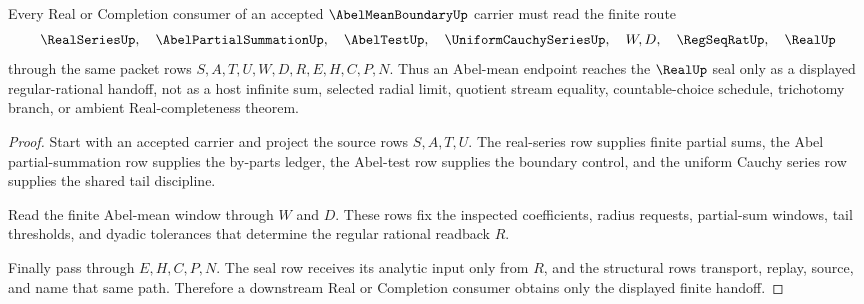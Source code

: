 \begin{theorem}
\label{thm:abel-mean-boundary-real-seal-route}
Every Real or Completion consumer of an accepted $\AbelMeanBoundaryUp$ carrier must read the finite route
$$
\RealSeriesUp,\quad \AbelPartialSummationUp,\quad \AbelTestUp,\quad \UniformCauchySeriesUp,\quad W,D,\quad \RegSeqRatUp,\quad \RealUp
$$
through the same packet rows $S,A,T,U,W,D,R,E,H,C,P,N$. Thus an Abel-mean endpoint reaches the $\RealUp$ seal only as a displayed regular-rational handoff, not as a host infinite sum, selected radial limit, quotient stream equality, countable-choice schedule, trichotomy branch, or ambient Real-completeness theorem.
\end{theorem}
\begin{proof}
Start with an accepted carrier and project the source rows $S,A,T,U$. The real-series row supplies finite partial sums, the Abel partial-summation row supplies the by-parts ledger, the Abel-test row supplies the boundary control, and the uniform Cauchy series row supplies the shared tail discipline.

Read the finite Abel-mean window through $W$ and $D$. These rows fix the inspected coefficients, radius requests, partial-sum windows, tail thresholds, and dyadic tolerances that determine the regular rational readback $R$.

Finally pass through $E,H,C,P,N$. The seal row receives its analytic input only from $R$, and the structural rows transport, replay, source, and name that same path. Therefore a downstream Real or Completion consumer obtains only the displayed finite handoff.
\end{proof}




